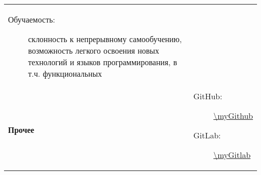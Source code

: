 \documentclass[../../main.tex]{subfiles}
\begin{document}
\begin{tabularx}{\textwidth}{>{\bfseries} p{2.5cm} X}
\begin{description}
                \item[Обучаемость:] склонность к непрерывному самообучению, возможность легкого освоения новых технологий и языков программирования, в т.ч. функциональных
            \end{description}\\
        Прочее &
            \begin{description}
                \item[GitHub:] \url{\myGithub}
                \item[GitLab:] \url{\myGitlab}
            \end{description}\\
    \end{tabularx}
\end{document}

